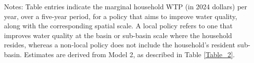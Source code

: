 \begin{table}[!ht]
\caption{Marginal willingness to pay for improvement in water quality}
\label{Table_3}
{}
\vspace{0.2em}

\small
Notes: Table entries indicate the marginal household WTP (in 2024 dollars) per year, over a five-year period, for a policy that aims to improve water quality, along with the corresponding spatial scale. A local policy refers to one that improves water quality at the basin or sub-basin scale where the household resides, whereas a non-local policy does not include the household’s resident sub-basin. Estimates are derived from Model 2, as described in Table \ref{Table_2}.
\end{table}